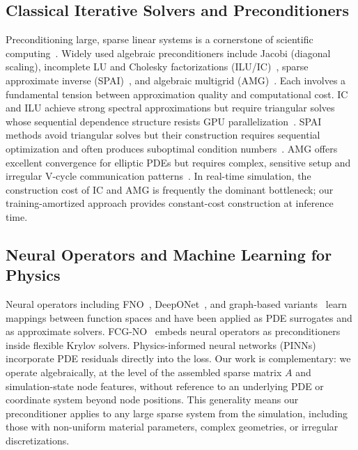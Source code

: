 \documentclass[acmtog,anonymous,review]{acmart}
\begin{document}
\subsection{Classical Iterative Solvers and Preconditioners}

Preconditioning large, sparse linear systems is a cornerstone of scientific
computing~\cite{saad2003iterative}.  Widely used algebraic preconditioners include Jacobi
(diagonal scaling), incomplete LU and Cholesky factorizations (ILU/IC)~\cite{lin1999incomplete},
sparse approximate inverse (SPAI)~\cite{kolotilina1993factorized,benzi1996sparse}, and algebraic
multigrid (AMG)~\cite{ruge1987algebraic}.  Each involves a fundamental tension between
approximation quality and computational cost.  IC and ILU achieve strong spectral approximations
but require triangular solves whose sequential dependence structure resists GPU
parallelization~\cite{liu2016synchronization,yamazaki2020performance}.  SPAI methods avoid
triangular solves but their construction requires sequential optimization and often produces
suboptimal condition numbers~\cite{yang2025sparse}.  AMG offers excellent convergence for elliptic
PDEs but requires complex, sensitive setup and irregular V-cycle communication
patterns~\cite{naumov2015amgx}.  In real-time simulation, the construction cost of IC and AMG is
frequently the dominant bottleneck; our training-amortized approach provides constant-cost
construction at inference time.

\subsection{Neural Operators and Machine Learning for Physics}

Neural operators including FNO~\cite{li2021fourier}, DeepONet~\cite{lu2021learning}, and
graph-based variants~\cite{li2020neural,li2020multipole} learn mappings between function spaces
and have been applied as PDE surrogates and as approximate solvers.  FCG-NO~\cite{rudikov2024neural}
embeds neural operators as preconditioners inside flexible Krylov solvers.  Physics-informed
neural networks (PINNs)~\cite{raissi2019physics} incorporate PDE residuals directly into the
loss.  Our work is complementary: we operate algebraically, at the level of the assembled sparse
matrix $A$ and simulation-state node features, without reference to an underlying PDE or
coordinate system beyond node positions.  This generality means our preconditioner applies to any
large sparse system from the simulation, including those with non-uniform material parameters,
complex geometries, or irregular discretizations.
\end{document}
